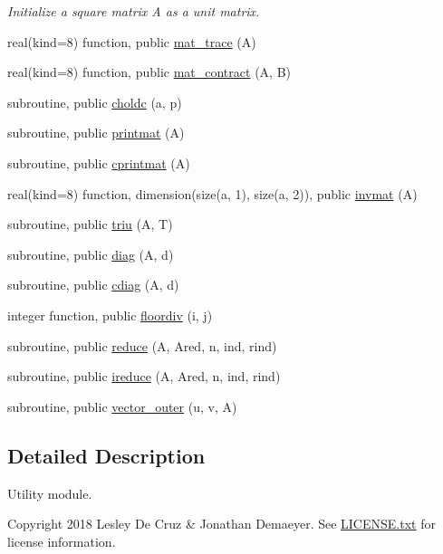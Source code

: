 \begin{DoxyCompactItemize}
\begin{DoxyCompactList}\small\item\em Initialize a square matrix A as a unit matrix. \end{DoxyCompactList}\item 
real(kind=8) function, public \hyperlink{namespaceutil_a9771c95546d8658e72aa24f76612e4d8}{mat\+\_\+trace} (A)
\item 
real(kind=8) function, public \hyperlink{namespaceutil_a8a0e15c77e8cd4cb03b608e4d6bfba67}{mat\+\_\+contract} (A, B)
\item 
subroutine, public \hyperlink{namespaceutil_ab832eeb8a78ffacc12e3ceac27f95ee7}{choldc} (a, p)
\item 
subroutine, public \hyperlink{namespaceutil_a71eb7216e62e0978ad1424bd4dbd727a}{printmat} (A)
\item 
subroutine, public \hyperlink{namespaceutil_ac600300c2251c6c6b555fe7255605aa5}{cprintmat} (A)
\item 
real(kind=8) function, dimension(size(a, 1), size(a, 2)), public \hyperlink{namespaceutil_a52a5fbd944196d1cf077be77aefa34a2}{invmat} (A)
\item 
subroutine, public \hyperlink{namespaceutil_a85f87eae65cbe6d073cf10511fafdd3e}{triu} (A, T)
\item 
subroutine, public \hyperlink{namespaceutil_ac3ee7743cab41502961891d342823d35}{diag} (A, d)
\item 
subroutine, public \hyperlink{namespaceutil_a9e8cf4396837bb186d59791ca594a98e}{cdiag} (A, d)
\item 
integer function, public \hyperlink{namespaceutil_ae789c59b87d1c0607478b1718d26cd1d}{floordiv} (i, j)
\item 
subroutine, public \hyperlink{namespaceutil_a14b782ae34e59c2dcb260a5a69aae213}{reduce} (A, Ared, n, ind, rind)
\item 
subroutine, public \hyperlink{namespaceutil_a92433c6b81993d62682f54ff5c8834a0}{ireduce} (A, Ared, n, ind, rind)
\item 
subroutine, public \hyperlink{namespaceutil_aac7cb677d9eaa896447a48be3f9a973f}{vector\+\_\+outer} (u, v, A)
\end{DoxyCompactItemize}


\subsection{Detailed Description}
Utility module. 

\begin{DoxyCopyright}{Copyright}
2018 Lesley De Cruz \& Jonathan Demaeyer. See \hyperlink{LICENSE_8txt}{L\+I\+C\+E\+N\+S\+E.\+txt} for license information. 
\end{DoxyCopyright}


